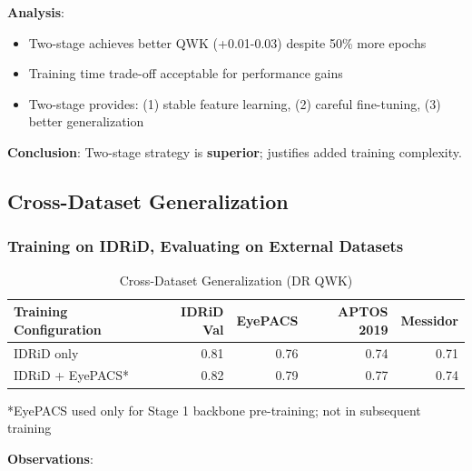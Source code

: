 \documentclass[12pt,a4paper]{article}
\begin{document}
\textbf{Analysis}:

\begin{itemize}
    \item Two-stage achieves better QWK (+0.01-0.03) despite 50\% more epochs
    \item Training time trade-off acceptable for performance gains
    \item Two-stage provides: (1) stable feature learning, (2) careful fine-tuning, (3) better generalization
\end{itemize}

\textbf{Conclusion}: Two-stage strategy is \textbf{superior}; justifies added training complexity.

\subsection{Cross-Dataset Generalization}

\subsubsection{Training on IDRiD, Evaluating on External Datasets}

\begin{table}[H]
\centering
\small
\caption{Cross-Dataset Generalization (DR QWK)}
\begin{tabular}{|l|r|r|r|r|}
\hline
\textbf{Training Configuration} & \textbf{IDRiD Val} & \textbf{EyePACS} & \textbf{APTOS 2019} & \textbf{Messidor} \\
\hline
IDRiD only & 0.81 & 0.76 & 0.74 & 0.71 \\
IDRiD + EyePACS* & 0.82 & 0.79 & 0.77 & 0.74 \\
\hline
\end{tabular}

\footnotesize
*EyePACS used only for Stage 1 backbone pre-training; not in subsequent training
\end{table}

\textbf{Observations}:
\end{document}
